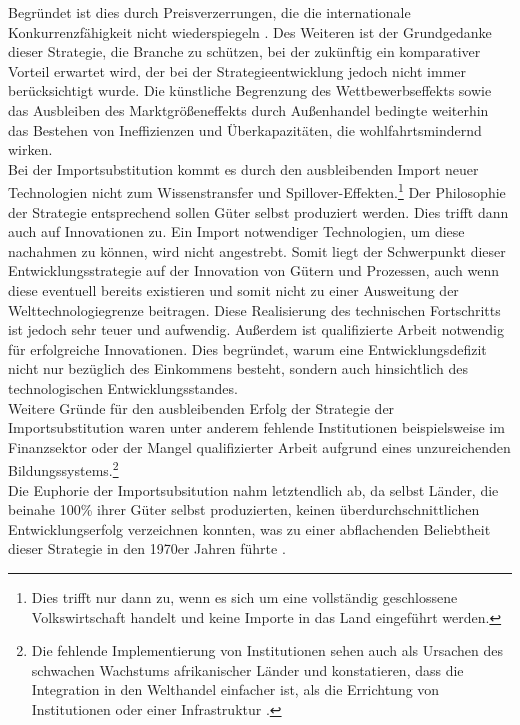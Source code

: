 Begründet ist dies durch Preisverzerrungen, die die internationale Konkurrenzfähigkeit nicht wiederspiegeln \cite{Lachmann.1994}. Des Weiteren ist der Grundgedanke dieser Strategie, die Branche zu schützen, bei der zukünftig ein komparativer Vorteil erwartet wird, der bei der Strategieentwicklung jedoch nicht immer berücksichtigt wurde. Die künstliche Begrenzung des Wettbewerbseffekts sowie das Ausbleiben des Marktgrößeneffekts durch Außenhandel bedingte weiterhin das Bestehen von Ineffizienzen und Überkapazitäten, die wohlfahrtsmindernd wirken. \\
%
Bei der Importsubstitution kommt es durch den ausbleibenden Import neuer Technologien nicht zum Wissenstransfer und Spillover-Effekten.\footnote{Dies trifft nur dann zu, wenn es sich um eine vollständig geschlossene Volkswirtschaft handelt und keine Importe in das Land eingeführt werden.} Der Philosophie der Strategie entsprechend sollen Güter selbst produziert werden. Dies trifft dann auch auf Innovationen zu. Ein Import notwendiger Technologien, um diese nachahmen zu können, wird nicht angestrebt. Somit liegt der Schwerpunkt dieser Entwicklungsstrategie auf der Innovation von Gütern und Prozessen, auch wenn diese eventuell bereits existieren und somit nicht zu einer Ausweitung der Welttechnologiegrenze beitragen. Diese Realisierung des technischen Fortschritts ist jedoch sehr teuer und aufwendig. Außerdem ist qualifizierte Arbeit notwendig für erfolgreiche Innovationen. Dies begründet, warum eine Entwicklungsdefizit nicht nur bezüglich des Einkommens besteht, sondern auch hinsichtlich des technologischen Entwicklungsstandes.\\
%
Weitere Gründe für den ausbleibenden Erfolg der Strategie der Importsubstitution waren unter anderem fehlende Institutionen beispielsweise im Finanzsektor oder der Mangel qualifizierter Arbeit aufgrund eines unzureichenden Bildungssystems.\footnote{Die fehlende Implementierung von Institutionen sehen auch \cite{Collier.1999} als Ursachen des schwachen Wachstums afrikanischer Länder und konstatieren, dass die Integration in den Welthandel einfacher ist, als die Errichtung von Institutionen oder einer Infrastruktur \cite{Collier.1999}.}\\
%
Die Euphorie der Importsubsitution nahm letztendlich ab, da selbst Länder, die beinahe 100{\%} ihrer Güter selbst produzierten, keinen überdurchschnittlichen Entwicklungserfolg verzeichnen konnten, was zu einer abflachenden Beliebtheit dieser Strategie in den 1970er Jahren führte \cite{LittleIanMalcolmDavid.1970}.\\
